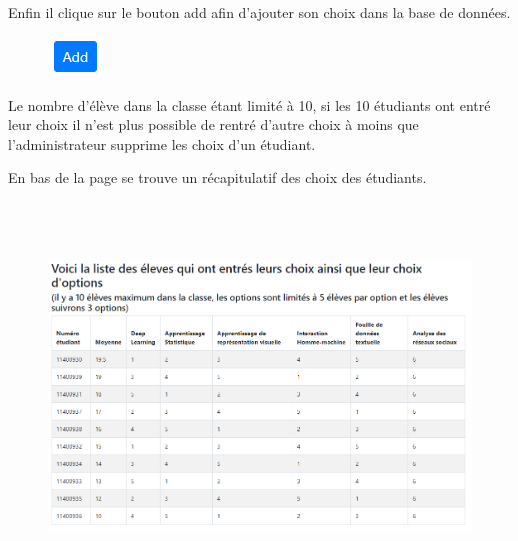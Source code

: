 \documentclass[12pt]{article}
\begin{document}
\begin{adjustwidth}{0.49in}{0.0in}
Enfin il clique sur le bouton add afin d’ajouter son choix dans la base de données.\par

\begin{figure}[H]
	\begin{Center}
		\includegraphics[width=0.56in,height=0.42in]{./media/image3.png}
	\end{Center}
\end{figure}


\end{adjustwidth}

\begin{adjustwidth}{0.49in}{0.0in}
Le nombre d’élève dans la classe étant limité à 10, si les 10 étudiants ont entré leur choix il n’est plus possible de rentré d’autre choix à moins que l’administrateur supprime les choix d’un étudiant.\par

\end{adjustwidth}

\begin{adjustwidth}{0.49in}{0.0in}
En bas de la page se trouve un récapitulatif des choix des étudiants.\par

\end{adjustwidth}




\begin{figure}[H]
	\begin{Center}
		\includegraphics[width=6.3in,height=4.06in]{./media/image4.png}
	\end{Center}
\end{figure}
\end{document}

